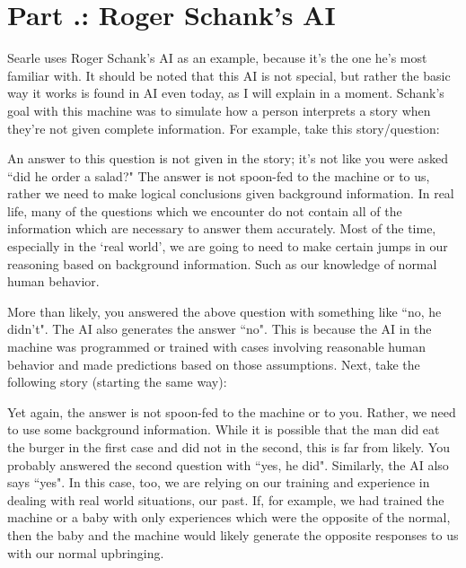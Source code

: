 \section{Part \thechapcount.\theseccount: Roger Schank's AI}
Searle uses Roger Schank's AI as an example, because it's the one he's most familiar with. It should be noted that this AI is not special, but rather the basic way it works is found in AI even today, as I will explain in a moment. Schank's goal with this machine was to simulate how a person interprets a story when they're not given complete information. For example, take this story/question:


An answer to this question is not given in the story; it's not like you were asked ``did he order a salad?" The answer is not spoon-fed to the machine or to us, rather we need to make logical conclusions given background information. In real life, many of the questions which we encounter do not contain all of the information which are necessary to answer them accurately. Most of the time, especially in the `real world', we are going to need to make certain jumps in our reasoning based on background information. Such as our knowledge of normal human behavior.

More than likely, you answered the above question with something like ``no, he didn't". The AI also generates the answer ``no". This is because the AI in the machine was programmed or trained with cases involving reasonable human behavior and made predictions based on those assumptions. Next, take the following story (starting the same way):


Yet again, the answer is not spoon-fed to the machine or to you. Rather, we need to use some background information. While it is possible that the man did eat the burger in the first case and did not in the second, this is far from likely. You probably answered the second question with ``yes, he did". Similarly, the AI also says ``yes". In this case, too, we are relying on our training and experience in dealing with real world situations, our past. If, for example, we had trained the machine or a baby with only experiences which were the opposite of the normal, then the baby and the machine would likely generate the opposite responses to us with our normal upbringing. 

